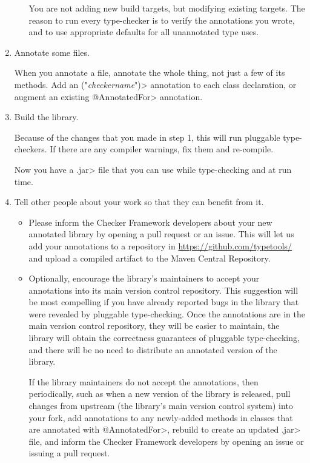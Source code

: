 \begin{enumerate}
\begin{itemize}
  You are not adding new build targets, but modifying existing targets.
  The reason to run every type-checker is to verify
  the annotations you wrote, and to use appropriate defaults for all
  unannotated type uses.
  \end{itemize}

\item Annotate some files.

  When you annotate a file, annotate the whole thing, not just a few of its
  methods.  Add an
  \<(\ttlcb"\emph{checkername}"\ttrcb)>
  annotation to each class declaration, or augment an existing \<@AnnotatedFor>
  annotation.

\item
  Build the library.

  Because of the changes that you made in step 1, this will run pluggable
  type-checkers.  If there are any compiler warnings, fix them and re-compile.

  Now you have a \<.jar> file that you can use while type-checking and at
  run time.

\item
  Tell other people about your work so that they can benefit from it.

  \begin{itemize}
  \item
    Please inform the Checker Framework developers
    about your new annotated library by opening a pull request or an issue.
    This will let us add your annotations to a repository in
    \url{https://github.com/typetools/} and upload a compiled artifact to
    the Maven Central Repository.

  \item
    Optionally, encourage the library's maintainers to accept your annotations into its
    main version control repository.  This suggestion will be most
    compelling if you have already reported bugs in the library that were
    revealed by pluggable type-checking.  Once the annotations are in the
    main version control repository, they will be easier
    to maintain, the library will obtain the correctness guarantees of
    pluggable type-checking, and there will be no need
    to distribute an annotated version of the library.

    If the library maintainers do not accept the annotations, then
    periodically, such as when a new version of the library is released,
    pull changes from upstream (the library's main version control system)
    into your fork, add annotations to any newly-added methods in classes
    that are annotated with \<@AnnotatedFor>, rebuild to create an updated
    \<.jar> file, and inform the Checker Framework developers by opening an
    issue or issuing a pull request.
  \end{itemize}

\end{enumerate}


